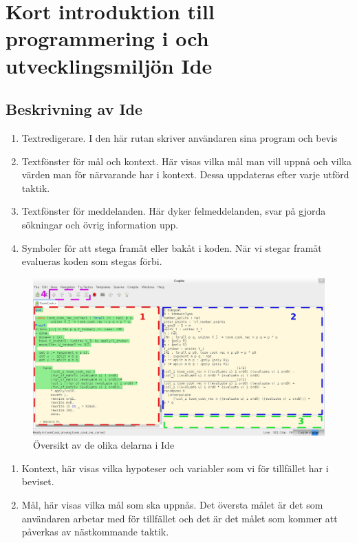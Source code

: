 \section{Kort introduktion till programmering i \coq och utvecklingsmiljön \coq
Ide}

\subsection{Beskrivning av \coq Ide}



\begin{enumerate}
\item Textredigerare. I den här rutan skriver användaren sina program och bevis
\item Textfönster för mål och kontext. Här visas vilka mål man vill uppnå och
  vilka värden man för närvarande har i kontext. Dessa uppdateras efter varje
  utförd taktik.
\item Textfönster för meddelanden. Här dyker felmeddelanden, svar på
  gjorda sökningar och övrig information upp.
\item Symboler för att stega framåt eller bakåt i koden. När vi stegar framåt
  evalueras koden som stegas förbi.
\end{enumerate}

\begin{figure}[H]
  \centering
  \includegraphics[width=\textwidth]{images/Overview}
  \caption[Översikt av \coq Ide]
   {Översikt av de olika delarna i \coq Ide}
\end{figure}

\begin{enumerate} %
\item Kontext, här visas vilka hypoteser och variabler som vi för tillfället
  har i beviset.
\item Mål, här visas vilka mål som ska uppnås. Det översta målet är det som
  användaren arbetar med för tillfället och det är det målet som kommer att
  påverkas av nästkommande taktik.
\end{enumerate}

